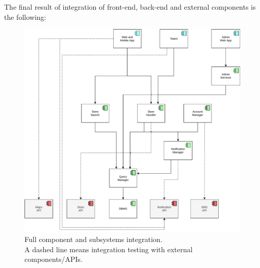 The final result of integration of front-end, back-end and external components is the following:
\begin{figure}[H]
    \centering
    \includegraphics[width=0.8\linewidth]{images/draw.io/integration_full.pdf}
    \caption{Full component and subsystems integration.\\ A dashed line means integration testing with external components/APIs.}
    \label{fig:full_components_integration}
\end{figure}